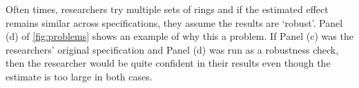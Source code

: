 \documentclass[10pt]{article}
\begin{document}
Often times, researchers try multiple sets of rings and if the estimated effect remains similar across specifications, they assume the results are `robust'. Panel (d) of \autoref{fig:problems} shows an example of why this a problem. If Panel (c) was the researchers' original specification and Panel (d) was run as a robustness check, then the researcher would be quite confident in their results even though the estimate is too large in both cases. 


\newpage~
\end{document}
